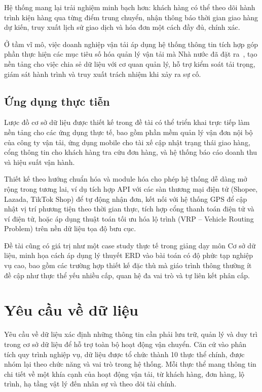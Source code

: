 \documentclass[11pt]{report}
\begin{document}
Hệ thống mang lại trải nghiệm minh bạch hơn: khách hàng có thể theo dõi hành trình kiện hàng qua từng điểm trung chuyển, nhận thông báo thời gian giao hàng dự kiến, truy xuất lịch sử giao dịch và hóa đơn một cách đầy đủ, chính xác.

Ở tầm vĩ mô, việc doanh nghiệp vận tải áp dụng hệ thống thông tin tích hợp góp phần thực hiện các mục tiêu số hóa quản lý vận tải mà Nhà nước đã đặt ra~\cite{Hoang2025QuanLyVanTai}, tạo nền tảng cho việc chia sẻ dữ liệu với cơ quan quản lý, hỗ trợ kiểm soát tải trọng, giám sát hành trình và truy xuất trách nhiệm khi xảy ra sự cố.

\subsection{Ứng dụng thực tiễn}
Lược đồ cơ sở dữ liệu được thiết kế trong đề tài có thể triển khai trực tiếp làm nền tảng cho các ứng dụng thực tế, bao gồm phần mềm quản lý vận đơn nội bộ của công ty vận tải, ứng dụng mobile cho tài xế cập nhật trạng thái giao hàng, cổng thông tin cho khách hàng tra cứu đơn hàng, và hệ thống báo cáo doanh thu và hiệu suất vận hành.

Thiết kế theo hướng chuẩn hóa và module hóa cho phép hệ thống dễ dàng mở rộng trong tương lai, ví dụ tích hợp API với các sàn thương mại điện tử (Shopee, Lazada, TikTok Shop) để tự động nhận đơn, kết nối với hệ thống GPS để cập nhật vị trí phương tiện theo thời gian thực, tích hợp cổng thanh toán điện tử và ví điện tử, hoặc áp dụng thuật toán tối ưu hóa lộ trình (VRP – Vehicle Routing Problem) trên nền dữ liệu tọa độ bưu cục.

Đề tài cũng có giá trị như một case study thực tế trong giảng dạy môn Cơ sở dữ liệu, minh họa cách áp dụng lý thuyết ERD vào bài toán có độ phức tạp nghiệp vụ cao, bao gồm các trường hợp thiết kế đặc thù mà giáo trình thông thường ít đề cập như thực thể yếu nhiều cấp, quan hệ đa vai trò và tự liên kết phân cấp.


\section{Yêu cầu về dữ liệu}
\label{sec:yeucaudulieu}

Yêu cầu về dữ liệu xác định những thông tin cần phải lưu trữ, quản lý và duy trì trong cơ sở dữ liệu để hỗ trợ toàn bộ hoạt động vận chuyển. Căn cứ vào phân tích quy trình nghiệp vụ, dữ liệu được tổ chức thành 10 thực thể chính, được nhóm lại theo chức năng và vai trò trong hệ thống. Mỗi thực thể mang thông tin chi tiết về một khía cạnh của hoạt động vận tải, từ khách hàng, đơn hàng, lộ trình, hạ tầng vật lý đến nhân sự và theo dõi tài chính.
\end{document}
